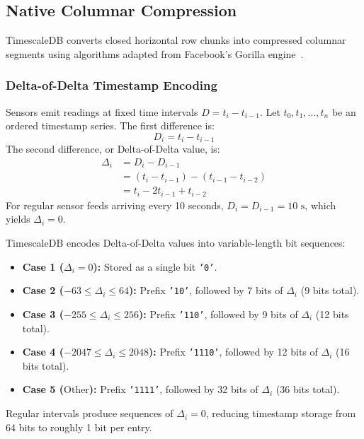 \documentclass[conference,a4paper]{IEEEtran}
\newcommand{\code}[1]{\texttt{\small #1}}
\begin{document}
\subsection{Native Columnar Compression}
TimescaleDB converts closed horizontal row chunks into compressed columnar segments using algorithms adapted from Facebook's Gorilla engine~\cite{pelkonen2015gorilla}.

\subsubsection{Delta-of-Delta Timestamp Encoding}
Sensors emit readings at fixed time intervals $D = t_i - t_{i-1}$. Let $t_0, t_1, \dots, t_n$ be an ordered timestamp series. The first difference is:
\begin{equation}
    D_i = t_i - t_{i-1}
\end{equation}
The second difference, or Delta-of-Delta value, is:
\begin{equation}
\begin{split}
    \Delta_i &= D_i - D_{i-1} \\
    &= (t_i - t_{i-1}) - (t_{i-1} - t_{i-2}) \\
    &= t_i - 2t_{i-1} + t_{i-2}
\end{split}
\end{equation}
For regular sensor feeds arriving every 10 seconds, $D_i = D_{i-1} = 10\text{ s}$, which yields $\Delta_i = 0$.

TimescaleDB encodes Delta-of-Delta values into variable-length bit sequences:
\begin{itemize}
    \item \textbf{Case 1 ($\Delta_i = 0$):} Stored as a single bit \code{'0'}.
    \item \textbf{Case 2 ($-63 \le \Delta_i \le 64$):} Prefix \code{'10'}, followed by 7 bits of $\Delta_i$ (9 bits total).
    \item \textbf{Case 3 ($-255 \le \Delta_i \le 256$):} Prefix \code{'110'}, followed by 9 bits of $\Delta_i$ (12 bits total).
    \item \textbf{Case 4 ($-2047 \le \Delta_i \le 2048$):} Prefix \code{'1110'}, followed by 12 bits of $\Delta_i$ (16 bits total).
    \item \textbf{Case 5 ($\text{Other}$):} Prefix \code{'1111'}, followed by 32 bits of $\Delta_i$ (36 bits total).
\end{itemize}
Regular intervals produce sequences of $\Delta_i = 0$, reducing timestamp storage from 64 bits to roughly 1 bit per entry.
\end{document}
